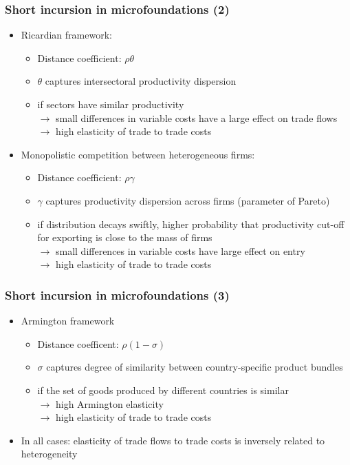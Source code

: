 \documentclass{beamer}
\begin{document}
\begin{frame}[plain]\frametitle{Short incursion in microfoundations (2)}
\vspace{.3cm}
\begin{itemize}
\item Ricardian framework: 
\begin{itemize}
\item Distance coefficient: $\rho\theta$
\item $\theta$ captures intersectoral productivity dispersion
\item if sectors have similar productivity \\ $\rightarrow$ small differences in variable costs have a large effect on trade flows
\\ $\rightarrow$ high elasticity of trade to trade costs
\end{itemize}
\vspace{.3cm}
\item Monopolistic competition between heterogeneous firms:
\begin{itemize}
\item Distance coefficient: $\rho\gamma$
\item $\gamma$ captures productivity dispersion across firms (parameter of Pareto)
\item if distribution decays swiftly, higher probability that productivity cut-off for exporting is close to the mass of firms \\ $\rightarrow$  small differences in variable costs have large effect on entry 
\\ $\rightarrow$ high elasticity of trade to trade costs
\end{itemize}
\end{itemize}
\end{frame}

\begin{frame}[plain]\frametitle{Short incursion in microfoundations (3)}
\begin{itemize}
\item Armington framework
\begin{itemize}
\item Distance coefficent:  $\rho(1-\sigma)$
\item $\sigma$ captures degree of similarity between country-specific product bundles
\item if the set of goods produced by different countries is similar \\ $\rightarrow$ high Armington elasticity 
\\ $\rightarrow$ high elasticity of trade to trade costs
\end{itemize}
\vspace{0.3cm}
\item In all cases: elasticity of trade flows to trade costs is inversely related to heterogeneity 
\end{itemize}
\end{frame}
\end{document}
